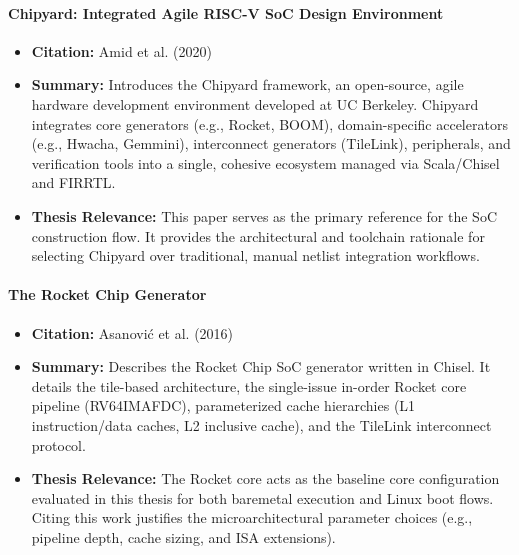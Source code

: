 \documentclass[12pt,a4paper]{article}
\begin{document}
\paragraph{Chipyard: Integrated Agile RISC-V SoC Design Environment}
\begin{itemize}
    \item \textbf{Citation:} Amid et al. (2020) \cite{amid2020chipyard}
    \item \textbf{Summary:} Introduces the Chipyard framework, an open-source, agile hardware development environment developed at UC Berkeley. Chipyard integrates core generators (e.g., Rocket, BOOM), domain-specific accelerators (e.g., Hwacha, Gemmini), interconnect generators (TileLink), peripherals, and verification tools into a single, cohesive ecosystem managed via Scala/Chisel and FIRRTL.
    \item \textbf{Thesis Relevance:} This paper serves as the primary reference for the SoC construction flow. It provides the architectural and toolchain rationale for selecting Chipyard over traditional, manual netlist integration workflows.
\end{itemize}

\paragraph{The Rocket Chip Generator}
\begin{itemize}
    \item \textbf{Citation:} Asanovi\'{c} et al. (2016) \cite{asanovic2016rocket}
    \item \textbf{Summary:} Describes the Rocket Chip SoC generator written in Chisel. It details the tile-based architecture, the single-issue in-order Rocket core pipeline (RV64IMAFDC), parameterized cache hierarchies (L1 instruction/data caches, L2 inclusive cache), and the TileLink interconnect protocol.
    \item \textbf{Thesis Relevance:} The Rocket core acts as the baseline core configuration evaluated in this thesis for both baremetal execution and Linux boot flows. Citing this work justifies the microarchitectural parameter choices (e.g., pipeline depth, cache sizing, and ISA extensions).
\end{itemize}
\end{document}

